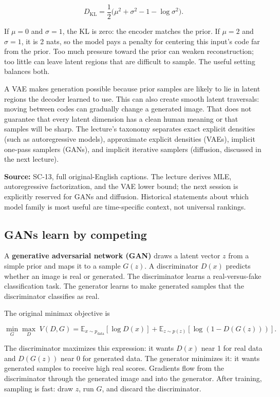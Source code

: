 \[
D_{\mathrm{KL}}=\frac12\big(\mu^2+\sigma^2-1-\log\sigma^2\big).
\]

If \(\mu=0\) and \(\sigma=1\), the KL is zero: the encoder matches the prior. If \(\mu=2\) and \(\sigma=1\), it is 2 nats, so the model pays a penalty for centering this input's code far from the prior. Too much pressure toward the prior can weaken reconstruction; too little can leave latent regions that are difficult to sample. The useful setting balances both.

A VAE makes generation possible because prior samples are likely to lie in latent regions the decoder learned to use. This can also create smooth latent traversals: moving between codes can gradually change a generated image. That does not guarantee that every latent dimension has a clean human meaning or that samples will be sharp. The lecture's taxonomy separates exact explicit densities (such as autoregressive models), approximate explicit densities (VAEs), implicit one-pass samplers (GANs), and implicit iterative samplers (diffusion, discussed in the next lecture).

\textbf{Source:} SC-13, full original-English captions. The lecture derives MLE, autoregressive factorization, and the VAE lower bound; the next session is explicitly reserved for GANs and diffusion. Historical statements about which model family is most useful are time-specific context, not universal rankings.

\subsection{GANs learn by competing}\label{04-visual-computing-ii-ch031-gans-learn-by-competing}

\hypertarget{04-visual-computing-ii-ch031-gans-learn-by-competing}{}

A \textbf{generative adversarial network (GAN)} draws a latent vector \(z\) from a simple prior and maps it to a sample \(G(z)\). A discriminator \(D(x)\) predicts whether an image is real or generated. The discriminator learns a real-versus-fake classification task. The generator learns to make generated samples that the discriminator classifies as real.

The original minimax objective is

\[
\min_G\max_D\;V(D,G)=
\mathbb{E}_{x\sim p_{\text{data}}}[\log D(x)]
+\mathbb{E}_{z\sim p(z)}[\log(1-D(G(z)))].
\]

The discriminator maximizes this expression: it wants \(D(x)\) near 1 for real data and \(D(G(z))\) near 0 for generated data. The generator minimizes it: it wants generated samples to receive high real scores. Gradients flow from the discriminator through the generated image and into the generator. After training, sampling is fast: draw \(z\), run \(G\), and discard the discriminator.

